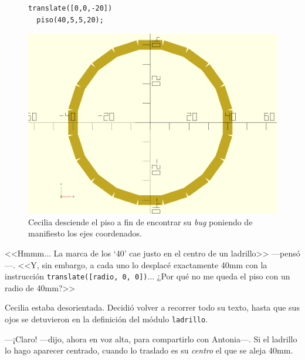 \begin{figure}[ht]
  \begin{minipage}[]{.5\textwidth}
    \begin{lstlisting}
translate([0,0,-20])
  piso(40,5,5,20);
    \end{lstlisting}
  \end{minipage}\hfill
  \begin{minipage}[]{.5\textwidth}
      \centering
      \includegraphics[width=\textwidth]{imagenes/piso-cenit-2}
    \end{minipage}
    \caption{Cecilia desciende el piso a fin de encontrar su
      \emph{bug} poniendo de manifiesto los ejes coordenados.}
  \label{fig:piso-cenit-2}
\end{figure}


<<Hmmm... La marca de los `40' cae justo en el centro de un ladrillo>>
---pensó---. <<Y, sin embargo, a cada uno lo desplacé exactamente 40mm
con la instrucción \lstinline!translate([radio, 0, 0])!... ¿Por qué no
me queda el piso con un radio de 40mm?>>

  Cecilia estaba desorientada. Decidió volver a recorrer todo su
  texto, hasta que sus ojos se detuvieron en la definición del módulo
  \texttt{ladrillo}.

  ---¡Claro! ---dijo, ahora en voz alta, para compartirlo con
  An\-to\-nia---. Si el ladrillo lo hago aparecer centrado, cuando lo
  traslado es su \emph{centro} el que se aleja 40mm.

